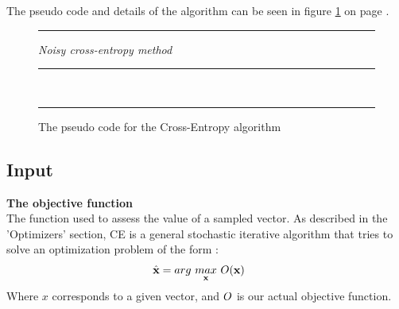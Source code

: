 The pseudo code and details of the algorithm can be seen in figure
\ref{fig:ceCode} on page \pageref{fig:ceCode}.

\begin{figure}[H]
\hrule
\vspace{0.2cm}
{\centering  \textit{Noisy cross-entropy method}}
\vspace{0.2cm}
\hrule
\begin{algorithmic}
\\

\Loop
{}
\EndLoop
\end{algorithmic}
\hrule
\caption{The pseudo code for the Cross-Entropy algorithm \label{fig:ceCode}}
\end{figure}

\subsection{Input}

\textbf{The objective function \label{CEObjective}} \\
The function used to assess the value of a sampled vector.
As described in the 'Optimizers' section, CE is a general stochastic 
iterative algorithm that tries to solve an optimization problem of 
the form \citep{thiery:09}:
\begin{align*}
\hat{\textbf{\individual }} &= 
arg \  \underset{\textbf{\individual }}{max} \  
\fitnessFunction (\textbf{\individual }) \ 
\end{align*}
Where $x$ corresponds to a given vector, 
and $O$ is our actual objective function. 
\\

